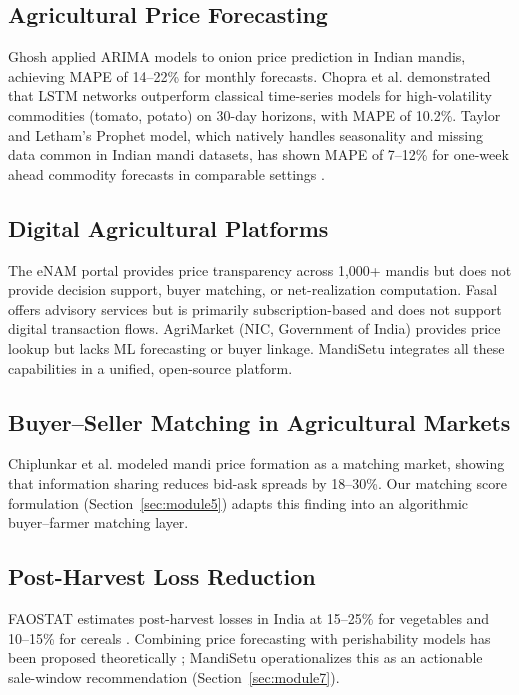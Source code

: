 \documentclass[conference]{IEEEtran}
\begin{document}
\subsection{Agricultural Price Forecasting}
Ghosh \cite{ghosh2013} applied ARIMA models to onion price prediction in Indian mandis, achieving MAPE of 14–22\% for monthly forecasts. Chopra et al. \cite{chopra2020} demonstrated that LSTM networks outperform classical time-series models for high-volatility commodities (tomato, potato) on 30-day horizons, with MAPE of 10.2\%. Taylor and Letham's Prophet \cite{prophet2018} model, which natively handles seasonality and missing data common in Indian mandi datasets, has shown MAPE of 7–12\% for one-week ahead commodity forecasts in comparable settings \cite{mishra2022}.

\subsection{Digital Agricultural Platforms}
The eNAM portal \cite{enam2016} provides price transparency across 1,000+ mandis but does not provide decision support, buyer matching, or net-realization computation. Fasal \cite{fasal2021} offers advisory services but is primarily subscription-based and does not support digital transaction flows. AgriMarket (NIC, Government of India) provides price lookup but lacks ML forecasting or buyer linkage. MandiSetu integrates all these capabilities in a unified, open-source platform.

\subsection{Buyer–Seller Matching in Agricultural Markets}
Chiplunkar et al. \cite{chiplunkar2019} modeled mandi price formation as a matching market, showing that information sharing reduces bid-ask spreads by 18–30\%. Our matching score formulation (Section~\ref{sec:module5}) adapts this finding into an algorithmic buyer–farmer matching layer.

\subsection{Post-Harvest Loss Reduction}
FAOSTAT estimates post-harvest losses in India at 15–25\% for vegetables and 10–15\% for cereals \cite{fao2019}. Combining price forecasting with perishability models has been proposed theoretically \cite{rais2015}; MandiSetu operationalizes this as an actionable sale-window recommendation (Section~\ref{sec:module7}).
\end{document}
